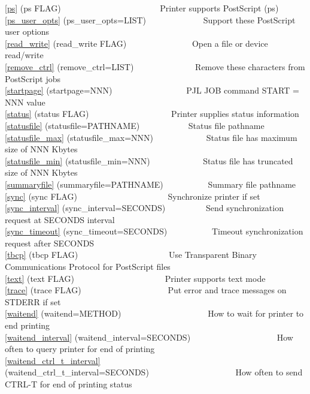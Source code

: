 \documentclass[a4paper]{article}
\begin{document}
{\ttfamily \ref{ps} {(ps FLAG)}}{\ttfamily ~~~~~~~~~~~~~~~~~~~~~~~} Printer supports PostScript (ps) \\ 
{\ttfamily \ref{ps_user_opts} {(ps\_user\_opts=LIST)}}{\ttfamily ~~~~~~~~~~~~~} Support these PostScript user options \\ 
{\ttfamily \ref{read_write} {(read\_write FLAG)}}{\ttfamily ~~~~~~~~~~~~~~~} Open a file or device read/write\\ 
{\ttfamily \ref{remove_ctrl} {(remove\_ctrl=LIST)}}{\ttfamily ~~~~~~~~~~~~~~} Remove these characters from PostScript jobs \\ 
{\ttfamily \ref{startpage} {(startpage=NNN)}}{\ttfamily ~~~~~~~~~~~~~~~~~} PJL JOB command START = NNN value \\ 
{\ttfamily \ref{status} {(status FLAG)}}{\ttfamily ~~~~~~~~~~~~~~~~~~~} Printer supplies status information \\ 
{\ttfamily \ref{statusfile} {(statusfile=PATHNAME)}}{\ttfamily ~~~~~~~~~~~} Status file pathname \\ 
{\ttfamily \ref{statusfile_max} {(statusfile\_max=NNN)}}{\ttfamily ~~~~~~~~~~~~} Status file has maximum size of NNN Kbytes \\ 
{\ttfamily \ref{statusfile_min} {(statusfile\_min=NNN)}}{\ttfamily ~~~~~~~~~~~~} Status file has truncated size of NNN Kbytes \\ 
{\ttfamily \ref{summaryfile} {(summaryfile=PATHNAME)}}{\ttfamily ~~~~~~~~~~} Summary file pathname \\ 
{\ttfamily \ref{sync} {(sync FLAG)}}{\ttfamily ~~~~~~~~~~~~~~~~~~~~~} Synchronize printer if set \\ 
{\ttfamily \ref{sync_interval} {(sync\_interval=SECONDS)}}{\ttfamily ~~~~~~~~~} Send synchronization request at SECONDS interval \\ 
{\ttfamily \ref{sync_timeout} {(sync\_timeout=SECONDS)}}{\ttfamily ~~~~~~~~~~} Timeout synchronization request after SECONDS \\ 
{\ttfamily \ref{tbcp} {(tbcp FLAG)}}{\ttfamily ~~~~~~~~~~~~~~~~~~~~~} Use Transparent Binary Communications Protocol for PostScript files \\ 
{\ttfamily \ref{text} {(text FLAG)}}{\ttfamily ~~~~~~~~~~~~~~~~~~~~~} Printer supports text mode \\ 
{\ttfamily \ref{trace} {(trace FLAG)}}{\ttfamily ~~~~~~~~~~~~~~~~~~~~} Put error and trace messages on STDERR if set \\ 
{\ttfamily \ref{waitend} {(waitend=METHOD)}}{\ttfamily ~~~~~~~~~~~~~~~~~~~~} How to wait for printer to end printing \\ 
{\ttfamily \ref{waitend_interval} {(waitend\_interval=SECONDS)}}{\ttfamily ~~~~~~~~~~~~~~~~~~~~} How often to query printer for end of printing \\ 
{\ttfamily \ref{waitend_ctrl_t_interval} {(waitend\_ctrl\_t\_interval=SECONDS)}}{\ttfamily ~~~~~~~~~~~~~~~~~~~~} How often to send CTRL-T for end of printing status \\ 
\end{document}
